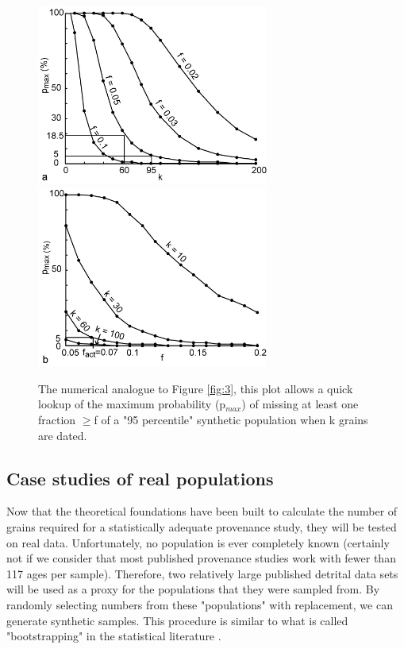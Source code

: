 \documentclass[12]{article}
\begin{document}
 \begin{figure}[here]
   \centering
   \includegraphics[width = 3in]{fig5a.jpg}
   \includegraphics[width = 3in]{fig5b.jpg}
   \caption{The numerical 
   analogue to Figure \ref{fig:3}, this  plot allows a quick lookup of
   the  maximum  probability  (p$_{max}$)  of  missing  at  least  one
   fraction $\geq$f  of a "95 percentile" synthetic  population when k
   grains are dated.}
   \label{fig:5}
 \end{figure}

\subsection{Case studies of real populations}\label{sec:natural}

Now that the theoretical foundations  have been built to calculate the
number  of grains  required  for a  statistically adequate  provenance
study, they will be tested on real data.  Unfortunately, no population
is  ever completely  known (certainly  not  if we  consider that  most
published  provenance  studies  work  with  fewer than  117  ages  per
sample). Therefore, two relatively  large published detrital data sets
will be  used as a  proxy for the  populations that they  were sampled
from.   By randomly  selecting numbers  from these  "populations" with
replacement,  we can  generate synthetic  samples.  This  procedure is
similar  to   what  is  called  "bootstrapping"   in  the  statistical
literature \cite{efron1993}.\\
\end{document}
